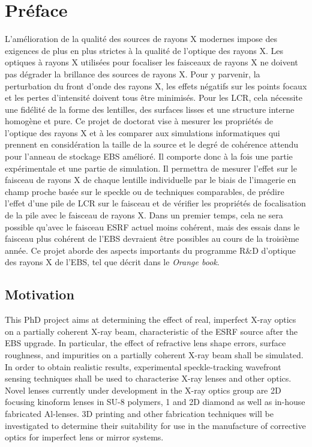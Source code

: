 
\chapter*{Préface}

L'amélioration de la qualité des sources de rayons X modernes impose des exigences de plus en plus strictes à la qualité de l'optique des rayons X. Les optiques à rayons X utilisées pour focaliser les faisceaux de rayons X ne doivent pas dégrader la brillance des sources de rayons X. Pour y parvenir, la perturbation du front d'onde des rayons X, les effets négatifs sur les points focaux et les pertes d'intensité doivent tous être minimisés. Pour les LCR, cela nécessite une fidélité de la forme des lentilles, des surfaces lisses et une structure interne homogène et pure. Ce projet de doctorat vise à mesurer les propriétés de l'optique des rayons X et à les comparer aux simulations informatiques qui prennent en considération la taille de la source et le degré de cohérence attendu pour l'anneau de stockage EBS amélioré. Il comporte donc à la fois une partie expérimentale et une partie de simulation. Il permettra de mesurer l'effet sur le faisceau de rayons X de chaque lentille individuelle par le biais de l'imagerie en champ proche basée sur le speckle ou de techniques comparables, de prédire l'effet d'une pile de LCR sur le faisceau et de vérifier les propriétés de focalisation de la pile avec le faisceau de rayons X. Dans un premier temps, cela ne sera possible qu'avec le faisceau ESRF actuel moins cohérent, mais des essais dans le faisceau plus cohérent de l'EBS devraient être possibles au cours de la troisième année. Ce projet aborde des aspects importants du programme R$\&$D d'optique des rayons X de l'EBS, tel que décrit dans le \textit{Orange book}.

\section*{Motivation}

This PhD project aims at determining the effect of real, imperfect X-ray optics on a partially coherent X-ray beam, characteristic of the ESRF source after the EBS upgrade. In particular, the effect of refractive lens shape errors, surface roughness, and impurities on a partially coherent X-ray beam shall be simulated. In order to obtain realistic results, experimental speckle-tracking wavefront sensing techniques shall be used to characterise X-ray lenses and other optics. Novel lenses currently under development in the X-ray optics group are 2D focusing kinoform lenses in SU-8 polymers, 1 and 2D diamond as well as in-house fabricated Al-lenses. 3D printing and other fabrication techniques will be investigated to determine their suitability for use in the manufacture of corrective optics for imperfect lens or mirror systems.

